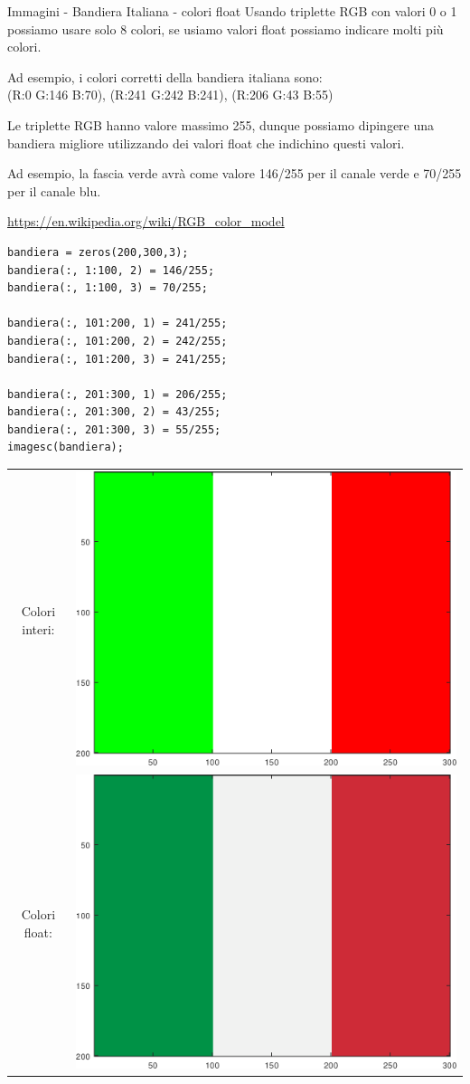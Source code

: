 \documentclass[format=169, handout]{beamer}
\begin{document}
\begin{frame}{Immagini - Bandiera Italiana - colori float}
Usando triplette RGB con valori 0 o 1 possiamo usare solo 8 colori, se usiamo valori float possiamo indicare molti più colori.

Ad esempio, i colori corretti della bandiera italiana sono:\\
(R:0 G:146 B:70), (R:241 G:242 B:241), (R:206 G:43 B:55)

Le triplette RGB hanno valore massimo 255, dunque possiamo dipingere una bandiera migliore utilizzando dei valori float che indichino questi valori.

Ad esempio, la fascia verde avrà come valore 146/255 per il canale verde e 70/255 per il canale blu.

\url{https://en.wikipedia.org/wiki/RGB_color_model}

\pause

\begin{lstlisting}[style=matlab]
bandiera = zeros(200,300,3);
bandiera(:, 1:100, 2) = 146/255;
bandiera(:, 1:100, 3) = 70/255;

bandiera(:, 101:200, 1) = 241/255;
bandiera(:, 101:200, 2) = 242/255;
bandiera(:, 101:200, 3) = 241/255;

bandiera(:, 201:300, 1) = 206/255;
bandiera(:, 201:300, 2) = 43/255;
bandiera(:, 201:300, 3) = 55/255;
imagesc(bandiera);
\end{lstlisting}

\pause
\centering
\begin{tabular}{cc}
	Colori interi: & \includegraphics[width=0.4\linewidth]{./bandiera1.png} \\
	Colori float: & \includegraphics[width=0.4\linewidth]{./bandiera2.png} \\
\end{tabular}
\end{frame}
\end{document}

